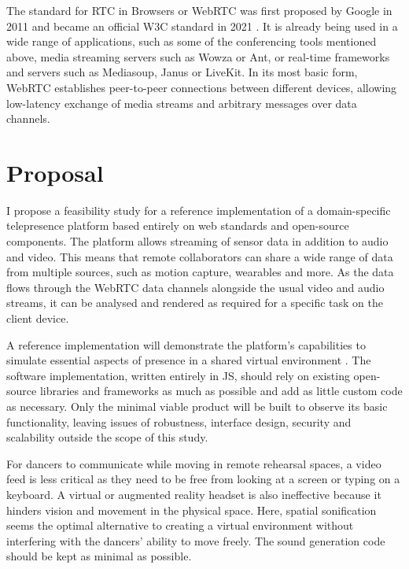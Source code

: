 The standard for \ac{RTC} in Browsers or \ac{WebRTC} \parencite{webRtcSpec} was first proposed by Google in 2011 and became an official \ac{W3C} standard in 2021 \parencite{webRtcOfficialWebStandard}.
It is already being used in a wide range of applications, such as some of the conferencing tools mentioned above, media streaming servers such as Wowza or Ant, or real-time frameworks and servers such as Mediasoup, Janus or LiveKit.
In its most basic form, \ac{WebRTC} establishes peer-to-peer connections between different devices, allowing low-latency exchange of media streams and arbitrary messages over data channels.

\section{Proposal}

I propose a feasibility study for a reference implementation of a domain-specific telepresence platform based entirely on web standards and open-source components.
The platform allows streaming of sensor data in addition to audio and video.
This means that remote collaborators can share a wide range of data from multiple sources, such as motion capture, wearables and more.
As the data flows through the WebRTC data channels alongside the usual video and audio streams, it can be analysed and rendered as required for a specific task on the client device.

A reference implementation will demonstrate the platform's capabilities to simulate essential aspects of presence in a shared virtual environment \parencite{surveyOfPresence}.
The software implementation, written entirely in \ac{JS}, should rely on existing open-source libraries and frameworks as much as possible and add as little custom code as necessary.
Only the minimal viable product will be built to observe its basic functionality, leaving issues of robustness, interface design, security and scalability outside the scope of this study.

For dancers to communicate while moving in remote rehearsal spaces, a video feed is less critical as they need to be free from looking at a screen or typing on a keyboard. A virtual or augmented reality headset is also ineffective because it hinders vision and movement in the physical space. Here, spatial sonification seems the optimal alternative to creating a virtual environment without interfering with the dancers' ability to move freely. The sound generation code should be kept as minimal as possible.

